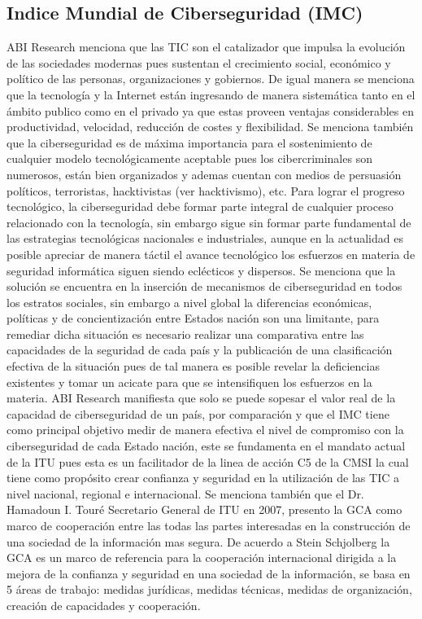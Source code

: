 \documentclass[runningheads,a4paper]{llncs}
\begin{document}
\subsection{Indice Mundial de Ciberseguridad (IMC)}
ABI Research \cite{GCSI_1} menciona que las \gls{TIC} son el catalizador que impulsa la evolución de las sociedades modernas pues sustentan el crecimiento social, económico y político de las personas, organizaciones y gobiernos. De igual manera se menciona que la tecnología y la Internet están ingresando de manera sistemática tanto en el ámbito publico como en el privado ya que estas proveen ventajas considerables en productividad, velocidad, reducción de costes y flexibilidad. Se menciona también que la ciberseguridad es de máxima importancia para el sostenimiento de cualquier modelo tecnológicamente aceptable pues los cibercriminales son numerosos, están bien organizados y ademas cuentan con medios de persuasión políticos, terroristas, hacktivistas (ver \gls{hacktivismo}), etc. Para lograr el progreso tecnológico, la ciberseguridad debe formar parte integral de cualquier proceso relacionado con la tecnología, sin embargo sigue sin formar parte fundamental de las estrategias tecnológicas nacionales e industriales, aunque en la actualidad es posible apreciar de manera táctil el avance tecnológico los esfuerzos en materia de seguridad informática siguen siendo eclécticos y dispersos. Se menciona que la solución se encuentra en la inserción de mecanismos de ciberseguridad en todos los estratos sociales, sin embargo a nivel global la diferencias económicas, políticas y de concientización entre Estados nación son una limitante, para remediar dicha situación es necesario realizar una comparativa entre las capacidades de la seguridad de cada país y la publicación de una clasificación efectiva de la situación pues de tal manera es posible revelar la deficiencias existentes y tomar un acicate para que se intensifiquen los esfuerzos en la materia. ABI Research \cite{GCSI_1} manifiesta que solo se puede sopesar el valor real de la capacidad de ciberseguridad de un país, por comparación y que el \gls{IMC} tiene como principal objetivo medir de manera efectiva el nivel de compromiso con la ciberseguridad de cada Estado nación, este se fundamenta en el mandato actual de la \gls{ITU} pues esta es un facilitador de la linea de acción C5 \cite{WSIS_1} de la \gls{CMSI} la cual tiene como propósito crear confianza y seguridad en la utilización de las \gls{TIC} a nivel nacional, regional e internacional. Se menciona también que el Dr. Hamadoun I. Touré Secretario General de \gls{ITU} en 2007, presento la \gls{GCA} como marco de cooperación entre las todas las partes interesadas en la construcción de una sociedad de la información mas segura. De acuerdo a Stein Schjolberg \cite{GCA_1} la \gls{GCA} es un marco de referencia para la cooperación internacional dirigida a la mejora de la confianza y seguridad en una sociedad de la información, se basa en 5 áreas de trabajo: medidas jurídicas, medidas técnicas, medidas de organización, creación de capacidades y cooperación.\\
\end{document}
